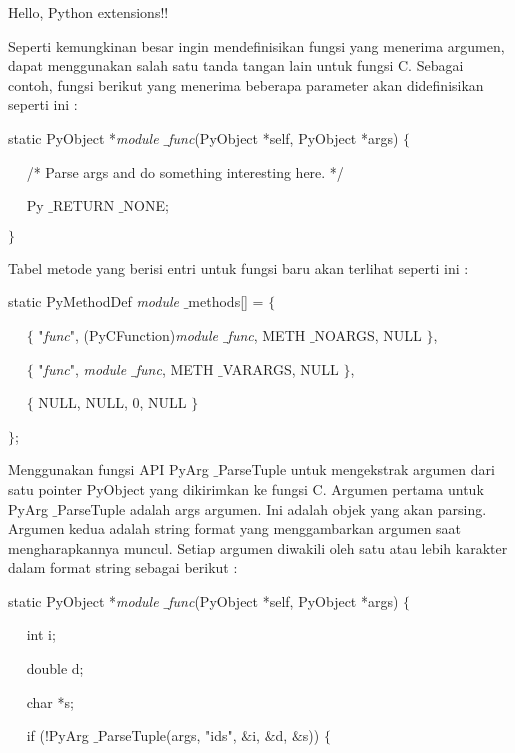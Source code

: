 \documentclass{wileySix}
\begin{document}
\begin{myEnumerate}
\begin{myEnumerate}
{\begin{myEnumerate}
\noindent 
Hello, Python extensions!! \par
\vspace{12pt}
Seperti kemungkinan besar ingin mendefinisikan fungsi yang menerima argumen, dapat menggunakan salah satu tanda tangan lain untuk fungsi C. Sebagai contoh, fungsi berikut yang menerima beberapa parameter akan didefinisikan seperti ini : \par
\noindent 
static PyObject *\textit{module $  \_  $func}(PyObject *self, PyObject *args)  $  \{  $ \par
\noindent 
~~ /* Parse args and do something interesting here. */ \par
\noindent 
~~ Py $  \_  $RETURN $  \_  $NONE; \par
\noindent 
$  \}  $ \par
\vspace{12pt}
Tabel metode yang berisi entri untuk fungsi baru akan terlihat seperti ini : \par
\noindent 
static PyMethodDef \textit{module} $  \_  $methods[] =  $  \{  $ \par
\noindent 
~~  $  \{  $ "\textit{func}", (PyCFunction)\textit{module $  \_  $func}, METH $  \_  $NOARGS, NULL  $  \}  $, \par
\noindent 
~~  $  \{  $ "\textit{func}", \textit{module $  \_  $func}, METH $  \_  $VARARGS, NULL  $  \}  $, \par
\noindent 
~~  $  \{  $ NULL, NULL, 0, NULL  $  \}  $ \par
\noindent 
$  \}  $; \par
\vspace{12pt}
Menggunakan fungsi API PyArg $  \_  $ParseTuple untuk mengekstrak argumen dari satu pointer PyObject yang dikirimkan ke fungsi C. Argumen pertama untuk PyArg $  \_  $ParseTuple adalah args argumen. Ini adalah objek yang akan parsing. Argumen kedua adalah string format yang menggambarkan argumen saat mengharapkannya muncul. Setiap argumen diwakili oleh satu atau lebih karakter dalam format string sebagai berikut : \par
\noindent 
static PyObject *\textit{module $  \_  $func}(PyObject *self, PyObject *args)  $  \{  $ \par
\noindent 
~~ int i; \par
\noindent 
~~ double d; \par
\noindent 
~~ char *s; \par
\vspace{12pt}
\noindent 
~~ if (!PyArg $  \_  $ParseTuple(args, "ids",  $  \&  $i,  $  \&  $d,  $  \&  $s))  $  \{  $ \par

\end{myEnumerate}}
\end{myEnumerate}
\end{myEnumerate}
\end{document}
